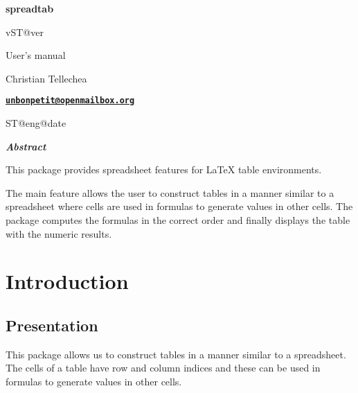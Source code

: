 \documentclass[a4paper,10pt]{article}
\newcommand\ST{\textsf{spreadtab}\xspace}
\begin{document}
\parindent0pt\pagestyle{fancy}
\begin{titlepage}
	\null\par\vfill
	\begin{center}
		\begin{minipage}{0.75\linewidth}
			\begin{center}
				\Huge\bfseries \ST\par\vspace{5pt}
				\small v\csname ST@ver\endcsname\par\vspace{25pt}
				\normalsize User's manual
			\end{center}
		\end{minipage}
	\end{center}
	\vspace{1cm}
	\begin{center}
		Christian {\sc Tellechea}\par\small
		\href{mailto:unbonpetit@openmailbox.org}{\texttt{\textbf{unbonpetit@openmailbox.org}}}\par\vspace{5pt}
		\csname ST@eng@date\endcsname
	\end{center}
	\vfill
	\begin{center}
		\begin{minipage}{0.8\linewidth}
			\noindent\hrulefill\par
			\hfill\textbf{\textit{Abstract}}\hfill{}\medskip\par\footnotesize
				This package provides spreadsheet features for \LaTeX{} table environments.\par\medskip
				The main feature allows the user to construct tables in a manner similar to a spreadsheet where cells are used in formulas to generate values in other cells. The package computes the formulas in the correct order and finally displays the table with the numeric results.\par
			\hrulefill
		\end{minipage}
	\end{center}
\vfill{}
\end{titlepage}

\tableofcontents\newpage
\parskip\medskipamount
\section{Introduction}

\subsection{Presentation}
This package allows us to construct tables in a manner similar to a spreadsheet. The cells of a table have row and column indices and these can be used in formulas to generate values in other cells.
\end{document}
